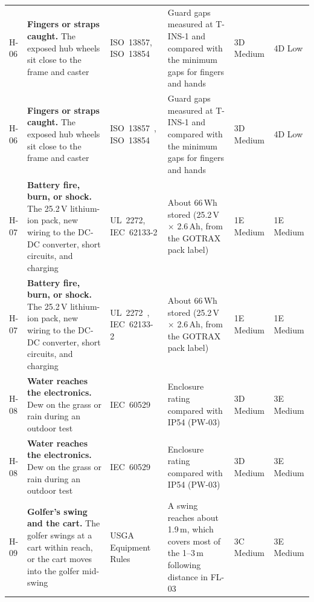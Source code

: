 \begin{table}[!htbp]
\begin{tabularx}{\linewidth}{@{}L{0.35in} Y L{1.02in} Y L{0.5in} L{0.5in}@{}}
H-06 & \textbf{Fingers or straps caught.} The exposed hub wheels sit close to the frame and caster & ISO~13857, ISO~13854 & Guard gaps measured at T-INS-1 and compared with the minimum gaps for fingers and hands & 3D Medium & 4D Low \\
H-06 & \textbf{Fingers or straps caught.} The exposed hub wheels sit close to the frame and caster & ISO~13857~\cite{iso13857}, ISO~13854~\cite{iso13854} & Guard gaps measured at T-INS-1 and compared with the minimum gaps for fingers and hands & 3D Medium & 4D Low \\
\addlinespace[2pt]
H-07 & \textbf{Battery fire, burn, or shock.} The 25.2\,V lithium-ion pack, new wiring to the \acs{DC-DC} converter, short circuits, and charging & UL~2272, IEC~62133-2 & About 66\,Wh stored (25.2\,V $\times$ 2.6\,Ah, from the GOTRAX pack label) & 1E Medium & 1E Medium \\
H-07 & \textbf{Battery fire, burn, or shock.} The 25.2\,V lithium-ion pack, new wiring to the \acs{DC-DC} converter, short circuits, and charging & UL~2272~\cite{ul2272}, IEC~62133-2~\cite{iec62133-2} & About 66\,Wh stored (25.2\,V $\times$ 2.6\,Ah, from the GOTRAX pack label) & 1E Medium & 1E Medium \\
\addlinespace[2pt]
H-08 & \textbf{Water reaches the electronics.} Dew on the grass or rain during an outdoor test & IEC~60529 & Enclosure rating compared with IP54 (PW-03) & 3D Medium & 3E Medium \\
H-08 & \textbf{Water reaches the electronics.} Dew on the grass or rain during an outdoor test & IEC~60529~\cite{iec60529} & Enclosure rating compared with IP54 (PW-03) & 3D Medium & 3E Medium \\
\addlinespace[2pt]
H-09 & \textbf{Golfer's swing and the cart.} The golfer swings at a cart within reach, or the cart moves into the golfer mid-swing & USGA Equipment Rules & A swing reaches about 1.9\,m, which covers most of the 1--3\,m following distance in FL-03 & 3C Medium & 3E Medium \\
\bottomrule
\end{tabularx}
\end{table}

